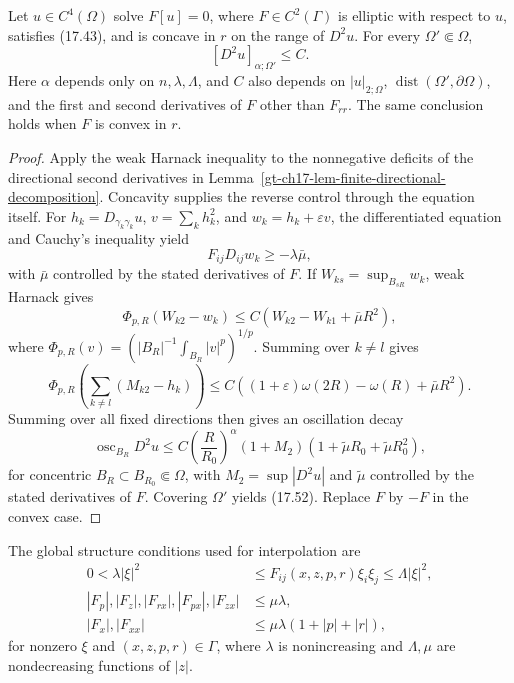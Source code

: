 \begin{theorem}
\label{gt-ch17-thm-interior-evans-krylov}
Let $u\in C^4(\Omega)$ solve $F[u]=0$, where $F\in C^2(\Gamma)$ is elliptic
with respect to $u$, satisfies (17.43), and is concave in $r$ on the range of
$D^2u$.  For every $\Omega'\Subset\Omega$,
\begin{equation}\tag{17.52}
[D^2u]_{\alpha;\Omega'}\le C.
\end{equation}
Here $\alpha$ depends only on $n,\lambda,\Lambda$, and $C$ also depends on
$|u|_{2;\Omega}$, $\operatorname{dist}(\Omega',\partial\Omega)$, and the
first and second derivatives of $F$ other than $F_{rr}$.  The same conclusion
holds when $F$ is convex in $r$.
\end{theorem}
\begin{proof}
\sketch Apply the weak Harnack inequality to the nonnegative deficits of the
directional second derivatives in
Lemma~\ref{gt-ch17-lem-finite-directional-decomposition}.  Concavity supplies the reverse
control through the equation itself. For $h_k=D_{\gamma_k\gamma_k}u$,
$v=\sum_kh_k^2$, and $w_k=h_k+\varepsilon v$, the differentiated equation
and Cauchy's inequality yield
\begin{equation}
\tag{17.48}
F_{ij}D_{ij}w_k\geq-\lambda\bar\mu,
\end{equation}
with $\bar\mu$ controlled by the stated derivatives of $F$. If
$W_{ks}=\sup_{B_{sR}}w_k$, weak Harnack gives
\begin{equation}
\tag{17.49}
\Phi_{p,R}(W_{k2}-w_k)
\leq C(W_{k2}-W_{k1}+\bar\mu R^2),
\end{equation}
where $\Phi_{p,R}(v)=(|B_R|^{-1}\int_{B_R}|v|^p)^{1/p}$.
Summing over $k\ne l$ gives
\begin{equation}
\tag{17.50}
\Phi_{p,R}\left(\sum_{k\ne l}(M_{k2}-h_k)\right)
\leq C((1+\varepsilon)\omega(2R)-\omega(R)+\bar\mu R^2).
\end{equation}
Summing over all fixed directions then gives
an oscillation decay
\[
\operatorname{osc}_{B_R}D^2u
\le C\left(\frac R{R_0}\right)^\alpha(1+M_2)
(1+\widetilde\mu R_0+\widetilde\mu R_0^2),
\tag{17.51}
\]
for concentric $B_R\subset B_{R_0}\Subset\Omega$, with
$M_2=\sup|D^2u|$ and $\widetilde\mu$ controlled by the stated derivatives of
$F$.  Covering $\Omega'$ yields (17.52).  Replace $F$ by $-F$ in the convex
case.
\end{proof}

The global structure conditions used for interpolation are
\begin{equation}\tag{17.53}
\begin{aligned}
0<\lambda|\xi|^2&\le F_{ij}(x,z,p,r)\xi_i\xi_j\le\Lambda|\xi|^2,\\
|F_p|,|F_z|,|F_{rx}|,|F_{px}|,|F_{zx}|&\le\mu\lambda,\\
|F_x|,|F_{xx}|&\le\mu\lambda(1+|p|+|r|),
\end{aligned}
\end{equation}
for nonzero $\xi$ and $(x,z,p,r)\in\Gamma$, where $\lambda$ is
nonincreasing and $\Lambda,\mu$ are nondecreasing functions of $|z|$.

